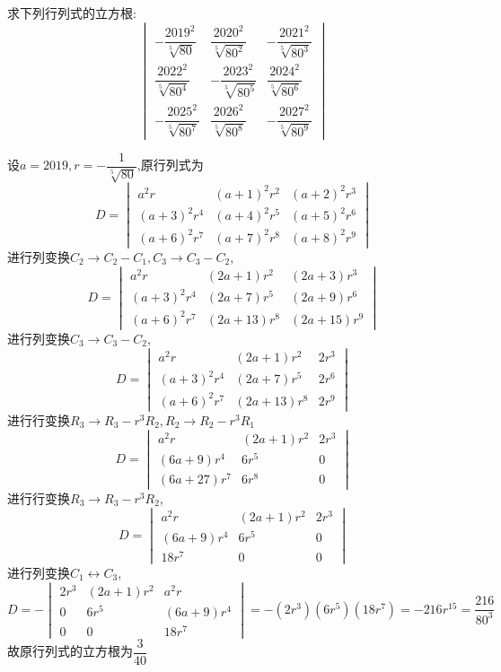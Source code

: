 \begin{questions}
    \question 求下列行列式的立方根:
    \[ 
    \begin{vmatrix}
    -\dfrac{2019^2}{\sqrt[5]{80}} & \dfrac{2020^2}{\sqrt[5]{80^2}} & -\dfrac{2021^2}{\sqrt[5]{80^3}} \\[8pt]
    \dfrac{2022^2}{\sqrt[5]{80^4}} & -\dfrac{2023^2}{\sqrt[5]{80^5}} & \dfrac{2024^2}{\sqrt[5]{80^6}} \\[8pt]
    -\dfrac{2025^2}{\sqrt[5]{80^7}} & \dfrac{2026^2}{\sqrt[5]{80^8}} & -\dfrac{2027^2}{\sqrt[5]{80^9}}
    \end{vmatrix}
    \]
    \begin{solution}
        设$a=2019,r=-\dfrac{1}{\sqrt[5]{80}}$,原行列式为
        \[
        D=
        \begin{vmatrix}
        a^2 r & (a+1)^2 r^2 & (a+2)^2 r^3 \\
        (a+3)^2 r^4 & (a+4)^2 r^5 & (a+5)^2 r^6 \\
        (a+6)^2 r^7 & (a+7)^2 r^8 & (a+8)^2 r^9
        \end{vmatrix}
        \]
        进行列变换$C_2 \rightarrow C_2-C_1,C_3 \rightarrow C_3-C_2$,
        \[
        D=\begin{vmatrix}
        a^2 r & (2a+1) r^2 & (2a+3) r^3 \\
        (a+3)^2 r^4 & (2a+7) r^5 & (2a+9) r^6 \\
        (a+6)^2 r^7 & (2a+13) r^8 & (2a+15) r^9
        \end{vmatrix}
        \]
        进行列变换$C_3 \rightarrow C_3-C_2$,
        \[
        D=\begin{vmatrix}
        a^2 r & (2a+1) r^2 & 2r^3 \\
        (a+3)^2 r^4 & (2a+7) r^5 & 2r^6 \\
        (a+6)^2 r^7 & (2a+13) r^8 & 2r^9
        \end{vmatrix}
        \]
        进行行变换$R_3 \rightarrow R_3-r^3R_2,R_2 \rightarrow R_2-r^3R_1$
        \[
        D=\begin{vmatrix}
        a^2 r & (2a+1) r^2 & 2r^3 \\
        (6a+9) r^4 & 6 r^5 & 0 \\
        (6a+27) r^7 & 6 r^8 & 0
        \end{vmatrix}
        \]
        进行行变换$R_3 \rightarrow R_3-r^3R_2$,
        \[
        D=\begin{vmatrix}
        a^2 r & (2a+1) r^2 & 2r^3 \\
        (6a+9) r^4 & 6 r^5 & 0 \\
        18 r^7 & 0 & 0
        \end{vmatrix}
        \]
        进行列变换$C_1 \leftrightarrow C_3$,
        \[
        D=-\begin{vmatrix}
        2r^3 & (2a+1) r^2 & a^2 r \\
        0 & 6 r^5 & (6a+9) r^4 \\
        0 & 0 & 18 r^7
        \end{vmatrix}
        =-(2r^3)(6r^5)(18r^7)=-216r^{15}=\frac{216}{80^3}
        \]
        故原行列式的立方根为$\dfrac{3}{40}$
    \end{solution}


\end{questions}
